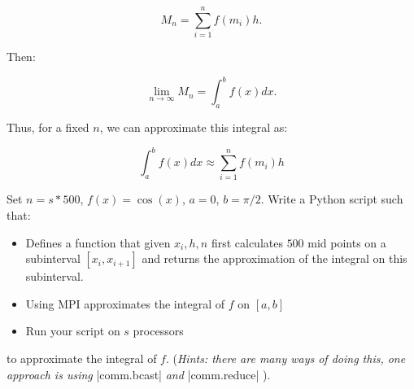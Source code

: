 \documentclass[11pt]{article}
\begin{document}
\[ M_n = \sum_{i=1}^{n} f(m_i)h. \]

Then:

\[ \underset{n \to \infty}{\lim}M_n = \int_a^b f(x) dx. \]

Thus, for a fixed $n$, we can approximate this integral as:

\[ \int_a^b f(x) dx \approx \sum_{i=1}^{n} f(m_i)h  \]

Set $n = s*500$, $f(x) = \cos(x)$, $a = 0$, $b = \pi /2$. Write a Python script such that:
\begin{itemize}
    \item Defines a function that given $x_i, h, n$ first calculates $500$ mid points on a subinterval $[x_{i}, x_{i+1}]$ and returns the approximation of the integral on this subinterval.
    \item Using MPI approximates the integral of $f$ on $[a,b]$
    \item Run your script on $s$ processors
\end{itemize}


to approximate the integral of $f$. (\textit{Hints: there are many ways of doing this, one approach is using } |comm.bcast| \textit{ and } |comm.reduce| ).
\end{document}
